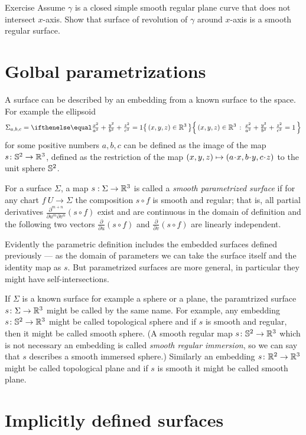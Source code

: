 \begin{thm}{Exercise}\label{ex:revolution}
Assume $\gamma$ is a closed simple smooth regular plane curve that does not intersect $x$-axis.
Show that surface of revolution of $\gamma$ around $x$-axis is a smooth regular surface.
\end{thm}


\section*{Golbal parametrizations} 
A surface can be described by an embedding from a known surface to the space.
For example the ellipsoid
\[\Sigma_{a,b,c}=\set{(x,y,z)\in\RR^3}{\tfrac{x^2}{a^2}+\tfrac{y^2}{b^2}+\tfrac{z^2}{c^2}=1}\]
for some positive numbers $a,b,c$ can be defined as the image of the map $s\colon\mathbb{S}^2\to\mathbb{R}^3$, defined as the restriction of the map $(x,y,z)\z\mapsto (a\cdot x, b\cdot y,c\cdot z)$ to the unit sphere $\mathbb{S}^2$.

For a surface $\Sigma$, a map $s: \Sigma \to \mathbb{R} ^3$ is called a 
\emph{smooth parametrized surface} if for any chart $f\:U\to \Sigma$ 
the composition $s\circ f$ is smooth and regular;
that is, all partial derivatives $\frac{\partial^{m+n}}{\partial u^m\partial v^n}(s\circ f)$ exist and are continuous in the domain of definition and the following two vectors 
$\frac{\partial}{\partial u}(s\circ f)$ and $\frac{\partial}{\partial v}(s\circ f)$ are linearly independent.

Evidently the parametric definition includes the embedded surfaces defined previously --- as the domain of parameters we can take the surface itself and the identity map as $s$.
But parametrized surfaces are more general, in particular they  might  have self-intersections.

If $\Sigma$ is a known surface for example a sphere or a plane, the paramtrized surface $s\colon\Sigma\to\mathbb{R}^3$ might be called by the same name.
For example, any embedding $s\colon\mathbb{S}^2\to\mathbb{R}^3$ might be called topological sphere
and if $s$ is smooth and regular, then it might be called smooth sphere.
(A smooth regular map $s\colon\mathbb{S}^2\to\mathbb{R}^3$ which is not necessary an embedding is called \emph{smooth regular immersion}, so we can say that $s$ describes a smooth immersed sphere.) 
Similarly an embedding $s\colon\mathbb{R}^2\to\mathbb{R}^3$ might be called topological plane
and if $s$ is smooth it might be called smooth plane.

\section*{Implicitly defined surfaces}

